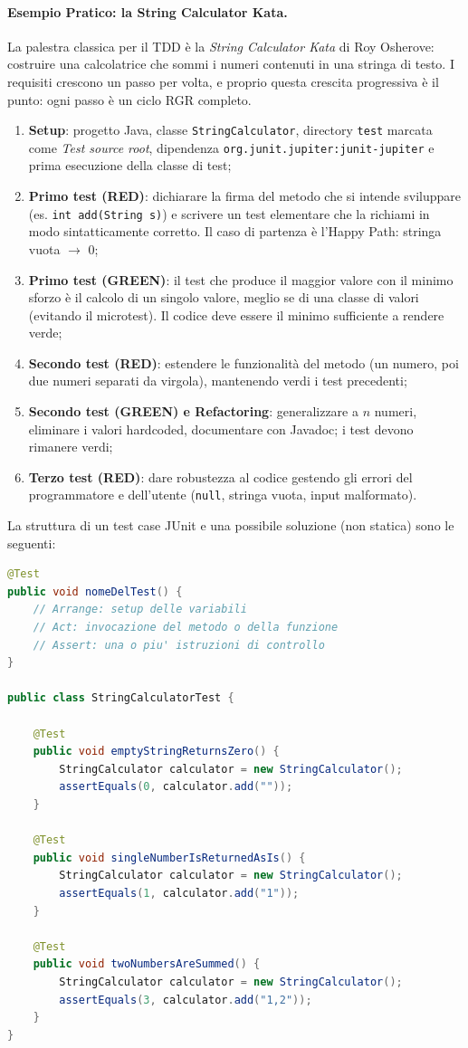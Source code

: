 \documentclass[12pt]{extarticle}
\begin{document}
\paragraph{Esempio Pratico: la String Calculator Kata.}
La palestra classica per il TDD è la \textit{String Calculator Kata} di Roy Osherove: costruire una calcolatrice che sommi i numeri contenuti in una stringa di testo. I requisiti crescono un passo per volta, e proprio questa crescita progressiva è il punto: ogni passo è un ciclo RGR completo.
\begin{enumerate}
    \item \textbf{Setup}: progetto Java, classe \texttt{StringCalculator}, directory \texttt{test} marcata come \textit{Test source root}, dipendenza \texttt{org.junit.jupiter:junit-jupiter} e prima esecuzione della classe di test;
    \item \textbf{Primo test (RED)}: dichiarare la firma del metodo che si intende sviluppare (es. \texttt{int add(String s)}) e scrivere un test elementare che la richiami in modo sintatticamente corretto. Il caso di partenza è l'Happy Path: stringa vuota $\to$ 0;
    \item \textbf{Primo test (GREEN)}: il test che produce il maggior valore con il minimo sforzo è il calcolo di un singolo valore, meglio se di una classe di valori (evitando il microtest). Il codice deve essere il minimo sufficiente a rendere verde;
    \item \textbf{Secondo test (RED)}: estendere le funzionalità del metodo (un numero, poi due numeri separati da virgola), mantenendo verdi i test precedenti;
    \item \textbf{Secondo test (GREEN) e Refactoring}: generalizzare a $n$ numeri, eliminare i valori hardcoded, documentare con Javadoc; i test devono rimanere verdi;
    \item \textbf{Terzo test (RED)}: dare robustezza al codice gestendo gli errori del programmatore e dell'utente (\texttt{null}, stringa vuota, input malformato).
\end{enumerate}

\noindent La struttura di un test case JUnit e una possibile soluzione (non statica) sono le seguenti:
\begin{lstlisting}[language=Java]
@Test
public void nomeDelTest() {
    // Arrange: setup delle variabili
    // Act: invocazione del metodo o della funzione
    // Assert: una o piu' istruzioni di controllo
}

public class StringCalculatorTest {

    @Test
    public void emptyStringReturnsZero() {
        StringCalculator calculator = new StringCalculator();
        assertEquals(0, calculator.add(""));
    }

    @Test
    public void singleNumberIsReturnedAsIs() {
        StringCalculator calculator = new StringCalculator();
        assertEquals(1, calculator.add("1"));
    }

    @Test
    public void twoNumbersAreSummed() {
        StringCalculator calculator = new StringCalculator();
        assertEquals(3, calculator.add("1,2"));
    }
}
\end{lstlisting}
\end{document}
